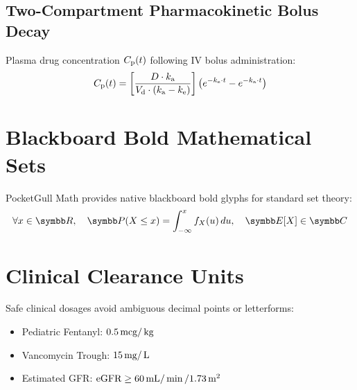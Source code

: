 \documentclass[11pt,a4paper]{article}
\begin{document}
\subsection{Two-Compartment Pharmacokinetic Bolus Decay}
Plasma drug concentration $C_{\text{p}}(t)$ following IV bolus administration:
\begin{equation}
C_{\text{p}}(t) = \left[ \frac{D \cdot k_{\text{a}}}{V_{\text{d}} \cdot (k_{\text{a}} - k_{\text{e}})} \right] \left( e^{-k_{\text{e}} \cdot t} - e^{-k_{\text{a}} \cdot t} \right)
\end{equation}

\section{Blackboard Bold Mathematical Sets}
PocketGull Math provides native blackboard bold glyphs for standard set theory:
\begin{equation}
\forall x \in \Rset, \quad \Prob(X \le x) = \int_{-\infty}^{x} f_X(u) \, du, \quad \Expect[X] \in \Cset
\end{equation}

\section{Clinical Clearance Units}
Safe clinical dosages avoid ambiguous decimal points or letterforms:
\begin{itemize}
    \item Pediatric Fentanyl: $0.5 \,\text{mcg} / \,\text{kg}$
    \item Vancomycin Trough: $15 \,\text{mg} / \,\text{L}$
    \item Estimated GFR: $\text{eGFR} \ge 60 \,\text{mL} / \min / 1.73 \, \text{m}^2$
\end{itemize}
\end{document}
